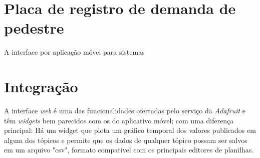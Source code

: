 \section{Placa de registro de demanda de pedestre}

A interface por aplicação móvel para sistemas 

\section{Integração}

A interface \textit{web} é uma das funcionalidades ofertadas pelo serviço da \textit{Adafruit} e têm \textit{widgets} bem parecidos com os do aplicativo móvel; com uma diferença principal: Há um widget que plota um gráfico temporal dos valores publicados em algum dos tópicos e permite que os dados de qualquer tópico possam ser salvos em um arquivo "csv", formato compatível com os principais editores de planilhas.
